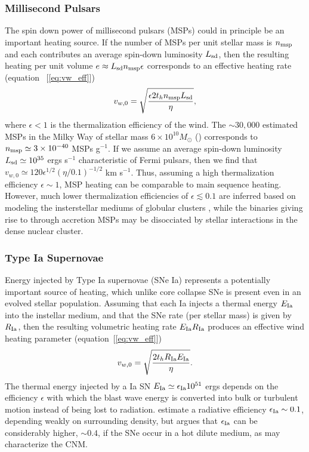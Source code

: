 \documentclass[usenatbib,fleqn]{mn2e}
\newcommand{\vwO}{v_{w,0}}
\begin{document}
\subsubsection{Millisecond Pulsars} The spin down power of millisecond
pulsars (MSPs) could in principle be an important heating source.  If
the number of MSPs per unit stellar mass is $n_{\rm msp}$ and each
contributes an average spin-down luminosity $L_{\rm sd}$, then the
resulting heating per unit volume $e \approx L_{\rm sd}n_{\rm
  msp}\epsilon$ corresponds to an effective heating rate (equation~
[\ref{eq:vw_eff}])
  \begin{align}
    \vwO=\sqrt{\frac{\epsilon 2 t_h n_{\rm msp} L_{\rm sd}}{\eta}},
  \end{align}
where $\epsilon< 1$ is the thermalization efficiency of the wind.  The $\sim 30,000$ estimated MSPs in the Milky Way of stellar mass $6\times 10^{10}M_{\odot}$ (\citealt{Lorimer13}) corresponds to $n_{\rm msp}\simeq3 \times 10^{-40} $ MSPs g$^{-1}$.  If we assume an average spin-down luminosity $L_{\rm sd}\simeq 10^{35}$ ergs s$^{-1}$ characteristic of Fermi pulsars, then we find that $\vwO\simeq 120\epsilon^{1/2} (\eta/0.1)^{-1/2}$ km s$^{-1}$.  Thus, assuming a high thermalization efficiency $\epsilon \sim 1$, MSP heating can be comparable to main sequence heating.  However, much lower thermalization efficiencies of $\epsilon \lesssim 0.1$ are inferred based on modeling the insterstellar mediums of globular clusters \citep{NaimanSoares-Furtado+:2013a}, while the binaries giving rise to through accretion MSPs may be disocciated by stellar interactions in the dense nuclear cluster.  
\subsubsection{Type Ia Supernovae} 

Energy injected by Type Ia supernovae (SNe Ia) represents a potentially important source of heating, which unlike core collapse SNe is present even in an evolved stellar population.  Assuming that each Ia injects a thermal energy $E_{\rm Ia}$ into the instellar medium, and that the SNe rate (per stellar mass) is given by $R_{\rm Ia}$, then the resulting volumetric heating rate $E_{\rm Ia}R_{\rm Ia}$ produces an effective wind heating parameter (equation~[\ref{eq:vw_eff}])
\begin{align}
    \vwO=\sqrt{\frac{2 t_h R_{\rm Ia} E_{\rm Ia}}{\eta}} \label{eq:vw_sne}.
\end{align}
The thermal energy injected by a Ia SN $E_{\rm Ia} \simeq \epsilon_{\rm Ia} 10^{51}$ ergs depends on the efficiency $\epsilon$ with which the blast wave energy is converted into bulk or turbulent motion instead of being lost to radiation.  \cite{Thornton+98} estimate a radiative efficiency $\epsilon_{\rm Ia} \sim 0.1$, depending weakly on surrounding density, but \citet{Sharma+14} argues that $\epsilon_{\rm Ia}$ can be considerably higher, $\sim 0.4$, if the SNe occur in a hot dilute medium, as may characterize the CNM.
\end{document}

